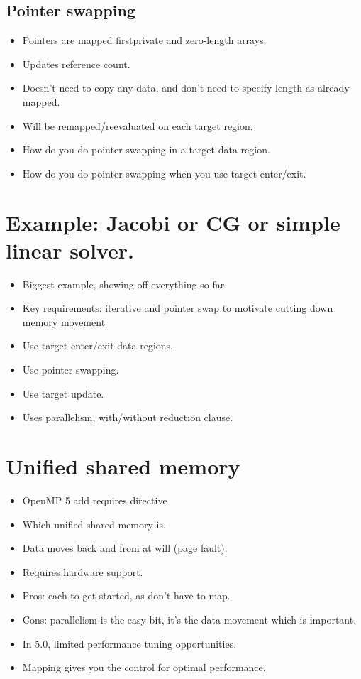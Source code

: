 \subsection{Pointer swapping}
\begin{itemize}
  \item Pointers are mapped firstprivate and zero-length arrays.
  \item Updates reference count.
  \item Doesn't need to copy any data, and don't need to specify length as already mapped.
  \item Will be remapped/reevaluated on each target region.
  \item How do you do pointer swapping in a target data region.
  \item How do you do pointer swapping when you use target enter/exit.
\end{itemize}

\section{Example: Jacobi or CG or simple linear solver.}
\begin{itemize}
  \item Biggest example, showing off everything so far.
  \item Key requirements: iterative and pointer swap to motivate cutting down memory movement
  \item Use target enter/exit data regions.
  \item Use pointer swapping.
  \item Use target update.
  \item Uses parallelism, with/without reduction clause.
\end{itemize}

\section{Unified shared memory}
\label{sec:usm}
\begin{itemize}
  \item OpenMP 5 add requires directive
  \item Which unified shared memory is.
  \item Data moves back and from at will (page fault).
  \item Requires hardware support.
  \item Pros: each to get started, as don't have to map.
  \item Cons: parallelism is the easy bit, it's the data movement which is important.
  \item In 5.0, limited performance tuning opportunities.
  \item Mapping gives you the control for optimal performance.
\end{itemize}


